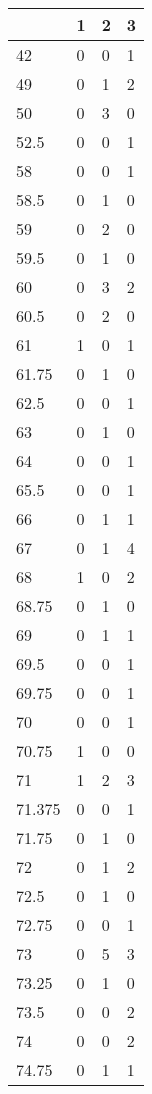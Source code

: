 \begin{table}[]
	\centering
	\label{my-label}
	\begin{tabular}{llll}
		& 1  & 2  & 3  \\
		\hline
		42     & 0  & 0  & 1  \\
		49     & 0  & 1  & 2  \\
		50     & 0  & 3  & 0  \\
		52.5   & 0  & 0  & 1  \\
		58     & 0  & 0  & 1  \\
		58.5   & 0  & 1  & 0  \\
		59     & 0  & 2  & 0  \\
		59.5   & 0  & 1  & 0  \\
		60     & 0  & 3  & 2  \\
		60.5   & 0  & 2  & 0  \\
		61     & 1  & 0  & 1  \\
		61.75  & 0  & 1  & 0  \\
		62.5   & 0  & 0  & 1  \\
		63     & 0  & 1  & 0  \\
		64     & 0  & 0  & 1  \\
		65.5   & 0  & 0  & 1  \\
		66     & 0  & 1  & 1  \\
		67     & 0  & 1  & 4  \\
		68     & 1  & 0  & 2  \\
		68.75  & 0  & 1  & 0  \\
		69     & 0  & 1  & 1  \\
		69.5   & 0  & 0  & 1  \\
		69.75  & 0  & 0  & 1  \\
		70     & 0  & 0  & 1  \\
		70.75  & 1  & 0  & 0  \\
		71     & 1  & 2  & 3  \\
		71.375 & 0  & 0  & 1  \\
		71.75  & 0  & 1  & 0  \\
		72     & 0  & 1  & 2  \\
		72.5   & 0  & 1  & 0  \\
		72.75  & 0  & 0  & 1  \\
		73     & 0  & 5  & 3  \\
		73.25  & 0  & 1  & 0  \\
		73.5   & 0  & 0  & 2  \\
		74     & 0  & 0  & 2  \\
		74.75  & 0  & 1  & 1  \\

\end{tabular}
\end{table}

